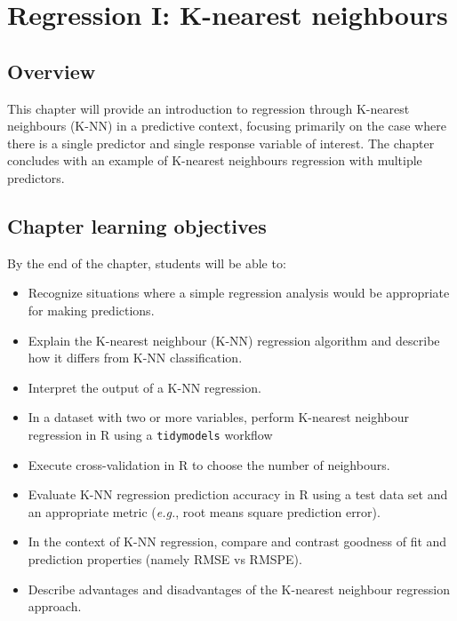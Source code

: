 \documentclass[
]{krantz}
\providecommand{\tightlist}{%
  \setlength{\itemsep}{0pt}\setlength{\parskip}{0pt}}
\begin{document}
\hypertarget{regression1}{%
\chapter{Regression I: K-nearest neighbours}\label{regression1}}

\hypertarget{overview-6}{%
\section{Overview}\label{overview-6}}

This chapter will provide an introduction to regression through K-nearest
neighbours (K-NN) in a predictive context, focusing primarily on the case where
there is a single predictor and single response variable of interest. The
chapter concludes with an example of K-nearest neighbours regression with
multiple predictors.

\hypertarget{chapter-learning-objectives-7}{%
\section{Chapter learning objectives}\label{chapter-learning-objectives-7}}

By the end of the chapter, students will be able to:

\begin{itemize}
\tightlist
\item
  Recognize situations where a simple regression analysis would be appropriate for making predictions.
\item
  Explain the K-nearest neighbour (K-NN) regression algorithm and describe how it differs from K-NN classification.
\item
  Interpret the output of a K-NN regression.
\item
  In a dataset with two or more variables, perform K-nearest neighbour regression in R using a \texttt{tidymodels} workflow
\item
  Execute cross-validation in R to choose the number of neighbours.
\item
  Evaluate K-NN regression prediction accuracy in R using a test data set and an appropriate metric (\emph{e.g.}, root means square prediction error).
\item
  In the context of K-NN regression, compare and contrast goodness of fit and prediction properties (namely RMSE vs RMSPE).
\item
  Describe advantages and disadvantages of the K-nearest neighbour regression approach.
\end{itemize}
\end{document}
